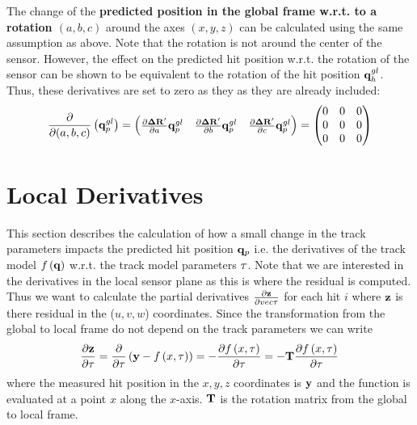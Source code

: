 \documentclass{article}
\def\vec#1{\ensuremath{\mathrm{\bf #1}}}
\def\partder#1#2{\ensuremath{\frac{\partial #1}{\partial #2}}}
\begin{document}
The change of the {\bf predicted position in the global frame w.r.t. to a rotation $(a,b,c)$} around the axes $(x,y,z)$ can be calculated using the same assumption as above. Note 
that the rotation is not around the center of the sensor. However, the effect on 
the predicted hit position w.r.t. the rotation of the sensor can be shown to be 
equivalent to the rotation of the hit position $\vec{q}^{gl}_h$. Thus, these derivatives are 
set to zero as they as they are already included:
\[
\partder{}{(a,b,c)} \left(\vec{q}^{gl}_p \right) =  
\begin{pmatrix}
\partder{\vec{\Delta R}'}{a} \vec{q}^{gl}_p  & \partder{\vec{\Delta R}'}{b} \vec{q}^{gl}_p & \partder{\vec{\Delta R}'}{c} \vec{q}^{gl}_p 
\end{pmatrix}
=
\begin{pmatrix}
0 & 0 & 0 \\
0 & 0 & 0 \\
0 & 0 & 0 \\
\end{pmatrix}
\]










\section{Local Derivatives}
\label{sec:localders}

This section describes the calculation of how a small change in the track parameters impacts the predicted 
hit position $\vec{q}_p$ i.e. the derivatives of the track model $f\left( \vec{q}\right)$ w.r.t. the track model parameters $\vec{\tau}$. Note that we are interested in the derivatives in the local sensor plane as this is 
where the residual is computed. Thus we want to calculate the partial derivatives 
\partder{\vec{z}}{vec{\tau}}  for each hit $i$ where $\vec{z}$ is there residual in the ($u,v,w$) coordinates. Since the transformation from the global to local frame do not depend on the track parameters we can write
\begin{equation}
\partder{\vec{z} }{\vec{\tau}} = \partder{}{\vec{\tau}} \left( \vec{y} - f\left(x,\vec{\tau}\right) \right) = - \partder{f\left( x,\vec{\tau} \right)}{\vec{\tau}} = -\vec{T} \partder{f\left( x,\vec{\tau} \right)}{\vec{\tau}} 
\end{equation}
where the measured hit position in the $x,y,z$ coordinates is $\vec{y}$ and the 
function is evaluated at a point $x$ along the $x$-axis. $\vec{T}$ is the rotation matrix from the global to local frame. 
\end{document}
